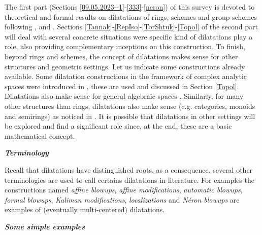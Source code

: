 \documentclass[10pt]{alggeom}
\theoremstyle{definition}
\numberwithin{equation}{section}
\begin{document}
The first part (Sections \ref{09.05.2023--1}-\ref{333}-\ref{neron}) of this survey is devoted to theoretical and formal results on dilatations of rings, schemes and group schemes following \cite{Du05}, \cite{MRR20} and \cite{Ma23d}. Sections \ref{Tannak}-\ref{RepIso}-\ref{TorShtuk}-\ref{Topol} of the second part will deal with several concrete situations were specific kind of dilatations play a role, also providing complementary inceptions on this construction.
To finish, beyond rings and schemes, the concept of dilatations makes sense for other structures and geometric settings. Let us indicate some constructions already available.
Some dilatation constructions in the framework of complex analytic spaces were introduced in \cite{Ka94}, these are used and discussed in Section \ref{Topol}. Dilatations also make sense for general algebraic spaces \cite{Ma23d}. Similarly, for many other structures than rings, dilatations also make sense (e.g. categories, monoids and semirings) as noticed in \cite{Ma23c}. It is possible that dilatations in other settings will be explored and find a significant role since, at the end, these are a basic mathematical concept.

\begin{center}
\textbf{\textit{Terminology}}
\end{center}
Recall that dilatations have distinguished  roots, as a consequence, several other terminologies are used to call certains dilatations in literature.  For examples the constructions named \textit{affine blowups}, \textit{affine modifications}, \textit{automatic blowups}, \textit{formal blowups}, \textit{Kaliman modifications}, \textit{localizations} and \textit{Néron blowups} are examples of (eventually multi-centered) dilatations.

\begin{center}
\textbf{{\textit{Some simple examples}}}
\end{center} 
\end{document}
